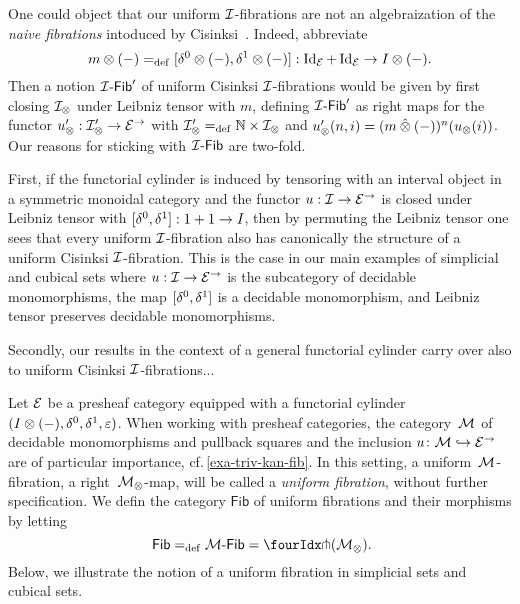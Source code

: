 \documentclass[reqno,10pt,a4paper,oneside]{amsart}
\begin{document}
\begin{remark}
One could object that our uniform $\cal{I}$-fibrations are not an algebraization of the \emph{naive fibrations} intoduced by Cisinksi~\cite{cisinski-asterisque}.
Indeed, abbreviate
\[
m \otimes (-) \defeq [\lcyl \otimes (-), \rcyl \otimes (-)] : \Id_\catE + \Id_\catE \to \interval \otimes (-)
.\]
Then a notion $\Fib{\cal{I}}'$ of uniform Cisinksi $\cal{I}$-fibrations would be given by first closing $\cal{I}_\otimes$ under Leibniz tensor with $m$, \ie defining $\Fib{\cal{I}}'$ as right maps for the functor $u_\otimes' : \cal{I}_\otimes' \to \catE^\to$ with $\cal{I}_\otimes' \defeq \mathbb{N} \times \cal{I}_\otimes$ and $u_\otimes'(n, i) = (m \hatotimes (-))^n(u_\otimes(i))$.
Our reasons for sticking with $\Fib{\cal{I}}$ are two-fold.

First, if the functorial cylinder is induced by tensoring with an interval object in a symmetric monoidal category and the functor $u : \cal{I} \to \catE^\to$ is closed under Leibniz tensor with $[\lcyl, \rcyl] : 1 + 1 \to \interval$, then by permuting the Leibniz tensor one sees that every uniform $\cal{I}$-fibration also has canonically the structure of a uniform Cisinksi $\cal{I}$-fibration.
This is the case in our main examples of simplicial and cubical sets where $u : \cal{I} \to \catE^\to$ is the subcategory of decidable monomorphisms, the map $[\lcyl, \rcyl]$ is a decidable monomorphism, and Leibniz tensor preserves decidable monomorphisms.

Secondly, our results  in the context of a general functorial cylinder carry over also to uniform Cisinksi $\cal{I}$-fibrations...
\end{remark}

\begin{example}
Let $\catE$ be a presheaf category equipped with a functorial cylinder $(\interval \otimes (-), \lcyl, \rcyl, \ccyl)$.
When working with presheaf categories, the category~$\cal{M}$ of decidable monomorphisms and pullback squares and the inclusion $u \co \cal{M} \hookrightarrow \cal{E}^\to$ are of particular importance, {cf.}\,\cref{exa-triv-kan-fib}.
In this setting, a uniform~$\cal{M}$-fibration, \ie a right~$\cal{M}_\otimes$-map, will be called a \emph{uniform fibration}, without further specification.
We defin the category $\mathsf{Fib}$ of uniform fibrations and their morphisms by letting
\[
\mathsf{Fib} \defeq \Fib{\cal{M}} = \liftr{(\cal{M}_\otimes)} \rlap{.}
\]
Below, we illustrate the notion of a uniform fibration in simplicial sets and cubical sets.
\end{example}
\end{document}
